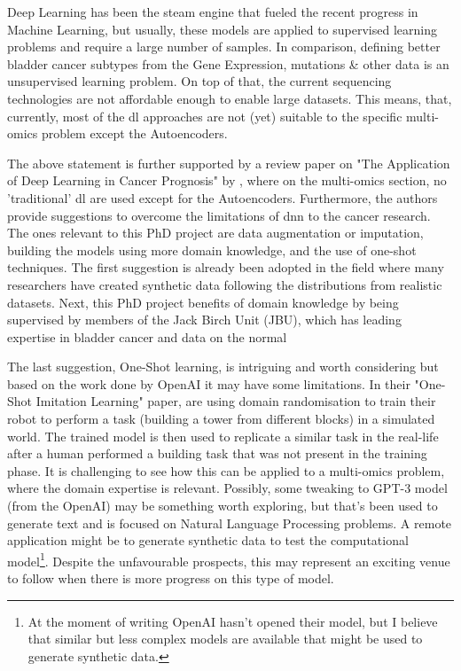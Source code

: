 Deep Learning has been the steam engine that fueled the recent progress in Machine Learning, but usually, these models are applied to supervised learning problems and require a large number of samples. In comparison, defining better bladder cancer subtypes from the Gene Expression, mutations \& other data is an unsupervised learning problem. On top of that, the current sequencing technologies are not affordable enough to enable large datasets. This means, that, currently, most of the \acrshort{dl} approaches are not (yet) suitable to the specific multi-omics problem except the Autoencoders.

The above statement is further supported by a review paper on "The Application of Deep Learning in Cancer Prognosis" by \citet{Zhu2020-cv}, where on the multi-omics section, no 'traditional' \acrshort{dl} are used except for the Autoencoders. Furthermore, the authors provide suggestions to overcome the limitations of \acrshort{dnn} to the cancer research. The ones relevant to this PhD project are data augmentation or imputation, building the models using more domain knowledge, and the use of one-shot techniques. The first suggestion is already been adopted in the field where many researchers have created synthetic data \cite{Zhao2012-wj,Leiserson2015-yk} following the distributions from realistic datasets. Next, this PhD project benefits of domain knowledge by being supervised by members of the Jack Birch Unit (JBU), which has leading expertise in bladder cancer and data on the normal

The last suggestion, One-Shot learning, is intriguing and worth considering but based on the work done by OpenAI it may have some limitations. In their "One-Shot Imitation Learning" paper, \citet{duan2017-ae} are using domain randomisation to train their robot to perform a task (building a tower from different blocks) in a simulated world. The trained model is then used to replicate a similar task in the real-life after a human performed a building task that was not present in the training phase. It is challenging to see how this can be applied to a multi-omics problem, where the domain expertise is relevant. Possibly, some tweaking to GPT-3\cite{Brown2020-wh} model (from the OpenAI) may be something worth exploring, but that's been used to generate text and is focused on Natural Language Processing problems. A remote application might be to generate synthetic data to test the computational model\footnote{At the moment of writing OpenAI hasn't opened their model, but I believe that similar but less complex models are available that might be used to generate synthetic data.}. Despite the unfavourable prospects, this may represent an exciting venue to follow when there is more progress on this type of model.

